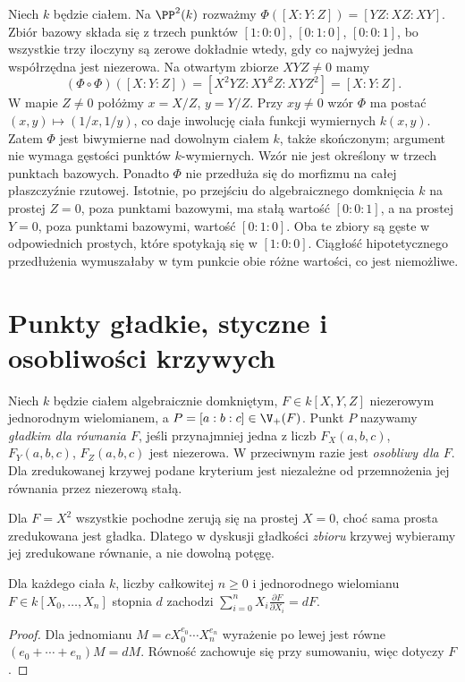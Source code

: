 \begin{przyklad}
Niech $k$ będzie ciałem. Na $\PP^2(k)$ rozważmy
$\Phi([X:Y:Z])=[YZ:XZ:XY]$.
Zbiór bazowy składa się z trzech punktów
$[1:0:0]$, $[0:1:0]$, $[0:0:1]$, bo wszystkie trzy iloczyny
są zerowe dokładnie wtedy, gdy co najwyżej jedna współrzędna
jest niezerowa. Na otwartym zbiorze $XYZ\ne0$ mamy
\[
 (\Phi\circ\Phi)([X:Y:Z])
 =[X^2YZ:XY^2Z:XYZ^2]=[X:Y:Z].
\]
W mapie $Z\ne0$ połóżmy $x=X/Z$, $y=Y/Z$.
Przy $xy\ne0$ wzór $\Phi$ ma postać
$(x,y)\mapsto(1/x,1/y)$, co daje inwolucję
ciała funkcji wymiernych $k(x,y)$. Zatem $\Phi$
jest biwymierne nad dowolnym ciałem $k$, także skończonym;
argument nie wymaga gęstości punktów $k$-wymiernych.
Wzór nie jest określony w trzech punktach bazowych.
Ponadto $\Phi$ nie przedłuża się do morfizmu na całej
płaszczyźnie rzutowej. Istotnie, po przejściu do
algebraicznego domknięcia $k$ na prostej $Z=0$,
poza punktami bazowymi, ma stałą wartość $[0:0:1]$,
a na prostej $Y=0$, poza punktami bazowymi, wartość
$[0:1:0]$. Oba te zbiory są gęste w odpowiednich
prostych, które spotykają się w $[1:0:0]$.
Ciągłość hipotetycznego przedłużenia wymuszałaby
w tym punkcie obie różne wartości, co jest niemożliwe.
\end{przyklad}

\section{Punkty gładkie, styczne i osobliwości krzywych}

\begin{definicja}
Niech $k$ będzie ciałem algebraicznie domkniętym,
$F\in k[X,Y,Z]$ niezerowym jednorodnym wielomianem,
a $P=[a:b:c]\in\V_+(F)$. Punkt $P$ nazywamy
\emph{gładkim dla równania $F$}, jeśli przynajmniej jedna
z liczb $F_X(a,b,c)$, $F_Y(a,b,c)$, $F_Z(a,b,c)$ jest
niezerowa. W przeciwnym razie jest \emph{osobliwy dla $F$}.
Dla zredukowanej krzywej podane kryterium jest niezależne
od przemnożenia jej równania przez niezerową stałą.
\end{definicja}

\begin{uwaga}
Dla $F=X^2$ wszystkie pochodne zerują się na prostej $X=0$,
choć sama prosta zredukowana jest gładka.
Dlatego w dyskusji gładkości \emph{zbioru} krzywej wybieramy
jej zredukowane równanie, a nie dowolną potęgę.
\end{uwaga}

\begin{lemat}
Dla każdego ciała $k$, liczby całkowitej $n\ge0$
i jednorodnego wielomianu
$F\in k[X_0,\dots,X_n]$ stopnia $d$ zachodzi
$\sum_{i=0}^nX_i\frac{\partial F}{\partial X_i}=dF$.
\end{lemat}
\begin{proof}
Dla jednomianu $M=cX_0^{e_0}\cdots X_n^{e_n}$
wyrażenie po lewej jest równe
$(e_0+\cdots+e_n)M=dM$.
Równość zachowuje się przy sumowaniu, więc dotyczy $F$.
\end{proof}

